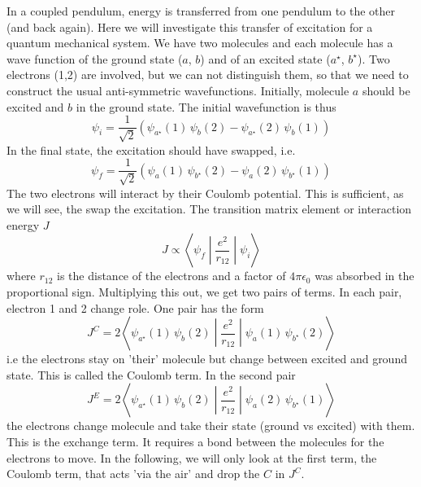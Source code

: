 In a coupled pendulum, energy is transferred from one pendulum to the other (and back again). Here we will investigate this transfer of excitation for a quantum mechanical system. We have two molecules and each molecule has a wave function of the ground state ($a$, $b$) and of an excited state ($a^\star$, $b^\star$). Two electrons (1,2) are involved, but we can not distinguish them, so that we need to construct the usual anti-symmetric wavefunctions. Initially, molecule $a$ should be excited and $b$ in the ground state. The initial wavefunction is thus
\begin{equation}
   \psi_i = \frac{1}{\sqrt{2}} \left( \psi_{a^\star}(1) \,  \psi_{b}(2) -   \psi_{a^\star}(2) \,  \psi_{b}(1)\right) 
\end{equation}
In the final state, the excitation should have swapped, i.e.
\begin{equation}
   \psi_f = \frac{1}{\sqrt{2}} \left( \psi_{a}(1) \,  \psi_{b^\star}(2) -   \psi_{a}(2) \,  \psi_{b^\star}(1)\right) 
\end{equation}
The two electrons will interact by their Coulomb potential. This is sufficient, as we will see, the swap the excitation. The transition matrix element or interaction energy $J$
\begin{equation}
   J \propto \left\langle \psi_f \middle| \frac{e^2}{r_{12}} \middle| \psi_i \right\rangle
\end{equation}
where $r_{12}$ is the distance of the electrons and a factor of $4\pi \epsilon_0$ was absorbed in the proportional sign. Multiplying this out, we get two pairs of terms. In each pair, electron 1 and 2 change role. One pair has the form
\begin{equation}
   J^C = 2  \left\langle  \psi_{a^\star}(1) \,  \psi_{b}(2)\middle| \frac{e^2}{r_{12}} \middle|  \psi_{a}(1) \,  \psi_{b^\star}(2)\right\rangle
\end{equation} 
i.e the electrons stay on 'their' molecule but change between excited and ground state. This is called the Coulomb term. In the second pair
\begin{equation}
   J^E = 2  \left\langle \psi_{a^\star}(1) \,  \psi_{b}(2) \middle| \frac{e^2}{r_{12}} \middle|  \psi_{a}(2) \,  \psi_{b^\star}(1) \right\rangle
\end{equation} 
%
the electrons change molecule and take their state (ground vs excited) with them. This is the exchange term. It requires a bond between the molecules for the electrons to move. In the following, we will only look at the first term, the Coulomb term, that acts 'via the air' and drop the $C$ in $J^C$.





